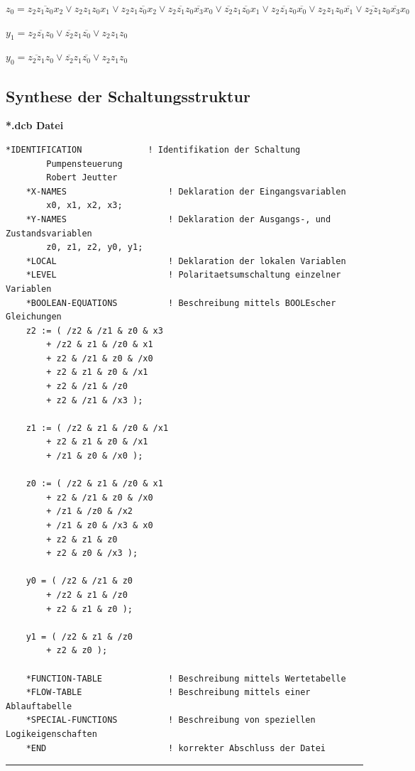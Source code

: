 \documentclass[a4paper,12pt,titlepage]{scrartcl}
\begin{document}
$z_0=\overline{z_2z_1z_0x_2}\vee z_2z_1z_0x_1 \vee z_2\overline{z_1z_0x_2} \vee z_2\overline{z_1}z_0\overline{x_3}x_0 \vee \overline{z_2}z_1\overline{z_0}x_1\vee z_2\overline{z_1}z_0\overline{x_0} \vee z_2z_1z_0\overline{x_1} \vee \overline{z_2z_1}z_0\overline{x_3}x_0$

$y_1= z_2\overline{z_1}z_0 \vee \overline{z_2}z_1\overline{z_0} \vee z_2z_1z_0$

$y_0= \overline{z_2z_1}z_0\vee \overline{z_2}z_1\overline{z_0}\vee z_2z_1z_0$
\newpage

\subsection*{Synthese der Schaltungsstruktur}
\textbf{*.dcb Datei}
\begin{lstlisting}[name=*.dcb-Datei, basicstyle=\tiny]
    *IDENTIFICATION             ! Identifikation der Schaltung
        Pumpensteuerung
        Robert Jeutter
    *X-NAMES                    ! Deklaration der Eingangsvariablen
        x0, x1, x2, x3;
    *Y-NAMES                    ! Deklaration der Ausgangs-, und Zustandsvariablen
        z0, z1, z2, y0, y1;
    *LOCAL                      ! Deklaration der lokalen Variablen        
    *LEVEL                      ! Polaritaetsumschaltung einzelner Variablen
    *BOOLEAN-EQUATIONS          ! Beschreibung mittels BOOLEscher Gleichungen
    z2 := ( /z2 & /z1 & z0 & x3
        + /z2 & z1 & /z0 & x1
        + z2 & /z1 & z0 & /x0
        + z2 & z1 & z0 & /x1
        + z2 & /z1 & /z0
        + z2 & /z1 & /x3 );

    z1 := ( /z2 & z1 & /z0 & /x1
        + z2 & z1 & z0 & /x1
        + /z1 & z0 & /x0 );

    z0 := ( /z2 & z1 & /z0 & x1
        + z2 & /z1 & z0 & /x0
        + /z1 & /z0 & /x2
        + /z1 & z0 & /x3 & x0
        + z2 & z1 & z0
        + z2 & z0 & /x3 );

    y0 = ( /z2 & /z1 & z0
        + /z2 & z1 & /z0
        + z2 & z1 & z0 );

    y1 = ( /z2 & z1 & /z0
        + z2 & z0 );

    *FUNCTION-TABLE             ! Beschreibung mittels Wertetabelle
    *FLOW-TABLE                 ! Beschreibung mittels einer Ablauftabelle
    *SPECIAL-FUNCTIONS          ! Beschreibung von speziellen Logikeigenschaften
    *END                        ! korrekter Abschluss der Datei
    \end{lstlisting}

\par\noindent\rule{\textwidth}{0.4pt}
\end{document}
